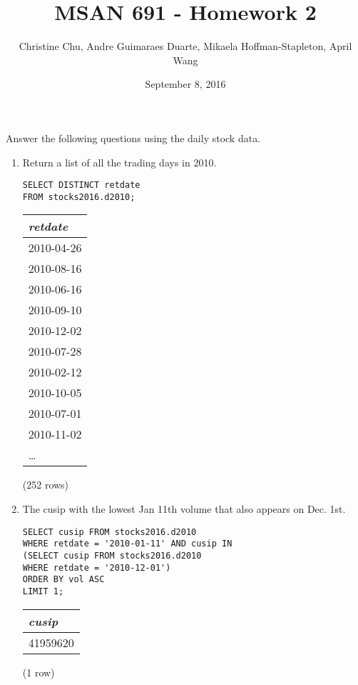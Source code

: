 \documentclass[]{article}
\title{MSAN 691 - Homework 2}
\author{Christine Chu, Andre Guimaraes Duarte, Mikaela Hoffman-Stapleton, April Wang}
\date{September 8, 2016}
\newenvironment{question}[2][Question]{\begin{trivlist}
\item[\hskip \labelsep {\bfseries #1}\hskip \labelsep {\bfseries #2.}]}{\end{trivlist}}
\begin{document}
\maketitle

\begin{question}{1}
Answer the following questions using the daily stock data.
\begin{enumerate}[label=(\alph*)]
\item Return a list of all the trading days in 2010.
  \color{blue}
\begin{verbatim}
SELECT DISTINCT retdate
FROM stocks2016.d2010;
  \end{verbatim}
\color{black}

\begin{center}
\begin{tabular}{l}
\textit{retdate} \\
\hline
2010-04-26 \\
2010-08-16 \\
2010-06-16 \\
2010-09-10 \\
2010-12-02 \\
2010-07-28 \\
2010-02-12 \\
2010-10-05 \\
2010-07-01 \\
2010-11-02 \\
\ldots \\
\end{tabular}

\noindent (252 rows) \\
\end{center}

\item The cusip with the lowest Jan 11th volume that also appears on Dec. 1st.
  \color{blue}
\begin{verbatim}
SELECT cusip FROM stocks2016.d2010
WHERE retdate = '2010-01-11' AND cusip IN
(SELECT cusip FROM stocks2016.d2010
WHERE retdate = '2010-12-01')
ORDER BY vol ASC
LIMIT 1;
  \end{verbatim}
\color{black}

\begin{center}
\begin{tabular}{l}
\textit{cusip} \\
\hline
41959620 \\
\end{tabular}

\noindent (1 row) \\
\end{center}


\end{enumerate}
\end{question}
\end{document}
